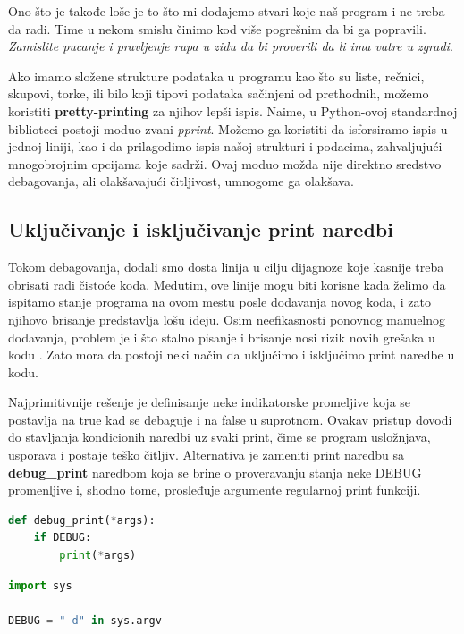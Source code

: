 \documentclass[a4paper]{article}
\begin{document}
Ono što je takođe loše je to što mi dodajemo stvari koje naš program i ne treba da radi. Time u nekom smislu činimo kod više pogrešnim da bi ga popravili. \emph{Zamislite pucanje i pravljenje rupa u zidu da bi proverili da li ima vatre u zgradi}\cite{excDocPyt}. 

Ako imamo složene strukture podataka u programu kao što su liste, rečnici, skupovi, torke, ili bilo koji tipovi podataka sačinjeni od prethodnih, možemo koristiti \textbf{pretty-printing} za njihov lepši ispis. Naime, u Python-ovoj standardnoj biblioteci postoji moduo zvani \emph{pprint}\cite{ppDocPyt}. Možemo ga koristiti da isforsiramo ispis u jednoj liniji, kao i da prilagodimo ispis našoj strukturi i podacima, zahvaljujući mnogobrojnim opcijama koje sadrži. Ovaj moduo možda nije direktno sredstvo debagovanja, ali olakšavajući čitljivost, umnogome ga olakšava. 
\subsection{Uključivanje i isključivanje print naredbi}
Tokom debagovanja, dodali smo dosta linija u cilju dijagnoze koje kasnije treba obrisati radi čistoće koda. Međutim, ove linije mogu biti korisne kada želimo da ispitamo stanje programa na ovom mestu posle dodavanja novog koda, i zato njihovo brisanje predstavlja lošu ideju. Osim neefikasnosti ponovnog manuelnog dodavanja, problem je i što stalno pisanje i brisanje nosi rizik novih grešaka u kodu \cite{proPyDeb}. Zato mora da postoji neki način da uključimo i isključimo print naredbe u kodu. 

Najprimitivnije rešenje je definisanje neke indikatorske promeljive koja se postavlja na true kad se debaguje i na false u suprotnom. Ovakav pristup dovodi do stavljanja kondicionih naredbi uz svaki print, čime se program usložnjava, usporava i postaje teško čitljiv. 
Alternativa je zameniti print naredbu sa  \textbf{debug\_print} naredbom koja se brine o proveravanju stanja neke DEBUG promenljive i, shodno tome, prosleđuje argumente regularnoj print funkciji. 
\begin{lstlisting}[language = python, caption = {Definisanje nove print funkcije}]
def debug_print(*args):
    if DEBUG:
        print(*args)
\end{lstlisting}
\begin{lstlisting}[language = python, caption = {Deklarisanje DEBUG promenljive}]
import sys

DEBUG = "-d" in sys.argv
\end{lstlisting}
\end{document}
